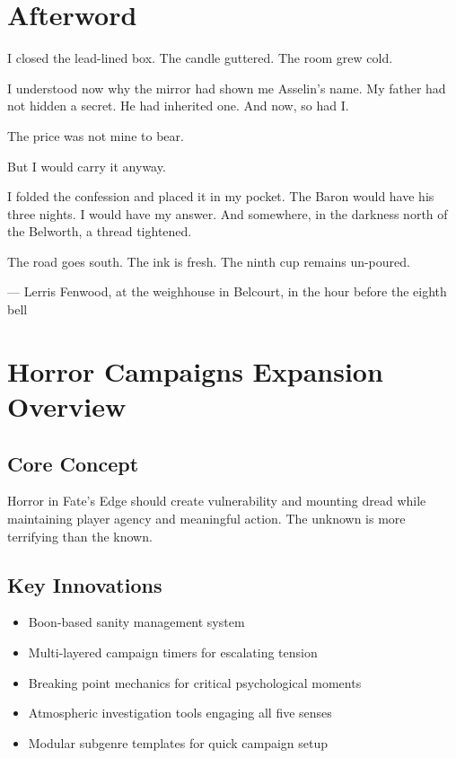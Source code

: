 \documentclass[11pt]{article}
\begin{document}
\newpage

\section*{Afterword}

I closed the lead-lined box. The candle guttered. The room grew cold.

I understood now why the mirror had shown me Asselin's name. My father had not hidden a secret. He had inherited one. And now, so had I.

The price was not mine to bear.

But I would carry it anyway.

I folded the confession and placed it in my pocket. The Baron would have his three nights. I would have my answer. And somewhere, in the darkness north of the Belworth, a thread tightened.

The road goes south. The ink is fresh. The ninth cup remains un-poured.

\vspace{1em}
\noindent
--- Lerris Fenwood, at the weighhouse in Belcourt, in the hour before the eighth bell

\newpage

\tableofcontents

\newpage

\section{Horror Campaigns Expansion Overview}

\subsection{Core Concept}

Horror in Fate's Edge should create vulnerability and mounting dread while maintaining player agency and meaningful action. The unknown is more terrifying than the known.

\subsection{Key Innovations}

\begin{itemize}
\item Boon-based sanity management system
\item Multi-layered campaign timers for escalating tension
\item Breaking point mechanics for critical psychological moments
\item Atmospheric investigation tools engaging all five senses
\item Modular subgenre templates for quick campaign setup
\end{itemize}
\end{document}
